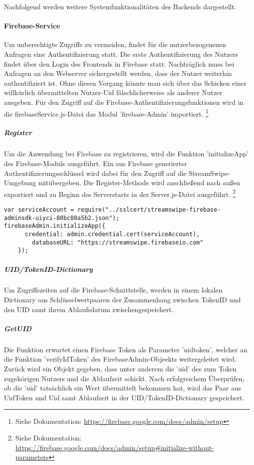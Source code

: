 Nachfolgend werden weitere Systemfunktionalitäten des Backends dargestellt.

\paragraph{Firebase-Service}
Um unberechtigte Zugriffe zu vermeiden, findet für die nutzerbezogenenen Anfragen eine Authentifizierung statt. Die erste Authentifizierung des Nutzers findet über den Login des Frontends in Firebase statt. Nachträglich muss bei Anfragen an den Webserver sichergestellt werden, dass der Nutzer weiterhin authentifiziert ist. Ohne diesen Vorgang könnte man sich über das Schicken einer willkürlich übermittelten Nutzer-Uid fälschlicherweise als anderer Nutzer ausgeben. Für den Zugriff auf die Firebase-Authentifizierungsfunktionen wird in die firebaseService.js-Datei das Modul 'firebase-Admin' importiert. \footnote{Siehe Dokumentation: \url{https://firebase.google.com/docs/admin/setup}}

\noindent
\subparagraph{Register}
Um die Anwendung bei Firebase zu registrieren, wird die Funktion 'initializeApp' des Firebase-Moduls ausgeführt. 
Ein aus Firebase generierter Authentifizierungsschlüssel wird dabei für den Zugriff auf die StreamSwipe-Umgebung mitübergeben.
Die Register-Methode wird anschließend nach außen exportiert und zu Beginn des Serverstarts in der Server.js-Datei ausgeführt. 
\footnote{Siehe Dokumentation: \url{https://firebase.google.com/docs/admin/setup\#initialize-without-parameters}}
   
\begin{lstlisting}[caption=Firebase-Service Register, label=lst:firebaseService Register]
var serviceAccount = require("../sslcert/streamswipe-firebase-adminsdk-uiyci-80bc08a5b2.json");
firebaseAdmin.initializeApp({
      credential: admin.credential.cert(serviceAccount),
        databaseURL: "https://streamswipe.firebaseio.com"
    });
\end{lstlisting}

\noindent
\subparagraph{UID/TokenID-Dictionary}
Um Zugriffszeiten auf die Firebase-Schnittstelle, werden in einem lokalen Dictionary aus Schlüsselwertpaaren der Zusammenhang zwischen TokenID und den UID samt ihrem Ablaufsdatum zwischen\-gespeichert.

\noindent
\subparagraph{GetUID}
Die Funktion erwartet einen Firebase Token als Parameter 'uidtoken', welcher an die Funktion 'verifyIdToken' des FirebaseAdmin-Objeekts weitergeleitet wird. Zurück wird ein Objekt gegeben, dass unter anderem die 'uid' des zum Token zugehörigen Nutzers und die Ablaufzeit schickt. Nach erfolgreichem Überprüfen, ob die 'uid' tatsächlich ein Wert übermittelt bekommen hat, wird das Paar aus UidToken und Uid samt Ablaufzeit in der UID/TokenID-Dictionary gespeichert.

